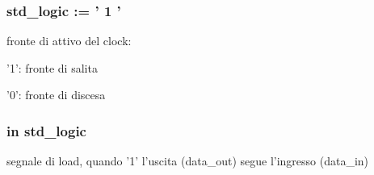 \hypertarget{group___generic_buffer_ga9079dbf8b7827a9cf522497d56994375}{
\subsubsection[{edge}]{ {\bfseries \textcolor{vhdlchar}{ }} {\bfseries \textcolor{vhdlchar}{std\+\_\+logic}\textcolor{vhdlchar}{ }\textcolor{vhdlchar}{ }\textcolor{vhdlchar}{\+:}\textcolor{vhdlchar}{=}\textcolor{vhdlchar}{ }\textcolor{vhdlchar}{ }\textcolor{vhdlchar}{'}\textcolor{vhdlchar}{ } \textcolor{vhdldigit}{1} \textcolor{vhdlchar}{ }\textcolor{vhdlchar}{'}\textcolor{vhdlchar}{ }} \hspace{0.3cm}{\ttfamily [Generic]}}}\label{group___generic_buffer_ga9079dbf8b7827a9cf522497d56994375}


fronte di attivo del clock\+:
\begin{DoxyItemize}
\item '1'\+: fronte di salita
\item '0'\+: fronte di discesa 
\end{DoxyItemize}

\hypertarget{group___generic_buffer_ga0a6af6eef40212dbaf130d57ce711256}{
\subsubsection[{ieee}]{\hspace{0.3cm}{\ttfamily [Library]}}}\label{group___generic_buffer_ga0a6af6eef40212dbaf130d57ce711256}
\hypertarget{group___generic_buffer_gaba761f7740d0b6257a0e283b3734ddbf}{
\subsubsection[{load}]{ {\bfseries \textcolor{vhdlchar}{in}\textcolor{vhdlchar}{ }} {\bfseries \textcolor{vhdlchar}{std\+\_\+logic}\textcolor{vhdlchar}{ }} \hspace{0.3cm}{\ttfamily [Port]}}}\label{group___generic_buffer_gaba761f7740d0b6257a0e283b3734ddbf}


segnale di load, quando '1' l'uscita (data\+\_\+out) segue l'ingresso (data\+\_\+in) 

